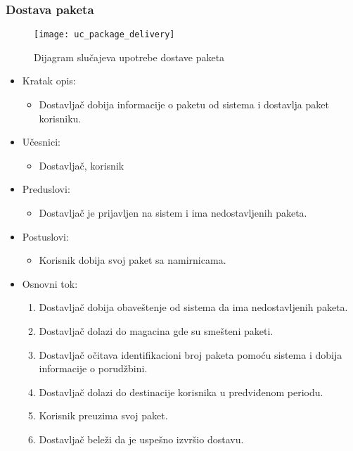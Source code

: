 
\subsubsection{Dostava paketa}
\begin{figure}[H]
	\begin{center}
		\texttt{[image: uc\_package\_delivery]}
	\end{center}
	\caption{Dijagram slučajeva upotrebe dostave paketa}
\end{figure}

	\begin{itemize}
		\item{Kratak opis:} 
		\begin{itemize}
			\item{Dostavljač dobija informacije o paketu od sistema i dostavlja paket korisniku.}
		\end{itemize}
		
		\item{Učesnici:} 
		\begin{itemize}
			\item{Dostavljač, korisnik}
		\end{itemize}		
		
		\item{Preduslovi:}
		\begin{itemize}
			\item{Dostavljač je prijavljen na sistem i ima nedostavljenih paketa. }
		\end{itemize}		

		\item{Postuslovi:}
		\begin{itemize}
			\item{Korisnik dobija svoj paket sa namirnicama.}
		\end{itemize}		
		
		\item{Osnovni tok:}
		\begin{enumerate}
			\item{Dostavljač dobija obaveštenje od sistema da ima nedostavljenih paketa.}
			\item{Dostavljač dolazi do magacina gde su smešteni paketi.}
			\item{Dostavljač očitava identifikacioni broj paketa pomoću sistema i dobija informacije o porudžbini.}
			\item{Dostavljač dolazi do destinacije korisnika u predviđenom periodu.}
			\item{Korisnik preuzima svoj paket.}
			\item{Dostavljač beleži da je uspešno izvršio dostavu.}
			

\end{enumerate}
\end{itemize}
